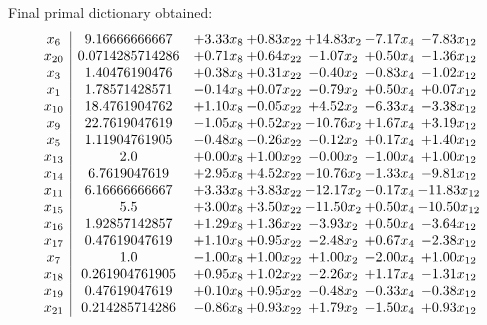 \documentclass[8pt]{article}
\begin{document}
 Final primal dictionary obtained: 
\[\begin{array}{c| c c@{\hskip 2pt} c@{\hskip 2pt} c@{\hskip 2pt} c@{\hskip 2pt} c@{\hskip 2pt} }
 x_{6}   &  9.16666666667 & +  3.33 x_{8} & +  0.83 x_{22} & + 14.83 x_{2} & -7.17 x_{4} & -7.83 x_{12}\\
 x_{20}   &  0.0714285714286 & +  0.71 x_{8} & +  0.64 x_{22} & -1.07 x_{2} & +  0.50 x_{4} & -1.36 x_{12}\\
 x_{3}   &  1.40476190476 & +  0.38 x_{8} & +  0.31 x_{22} & -0.40 x_{2} & -0.83 x_{4} & -1.02 x_{12}\\
 x_{1}   &  1.78571428571 & -0.14 x_{8} & +  0.07 x_{22} & -0.79 x_{2} & +  0.50 x_{4} & +  0.07 x_{12}\\
 x_{10}   &  18.4761904762 & +  1.10 x_{8} & -0.05 x_{22} & +  4.52 x_{2} & -6.33 x_{4} & -3.38 x_{12}\\
 x_{9}   &  22.7619047619 & -1.05 x_{8} & +  0.52 x_{22} & -10.76 x_{2} & +  1.67 x_{4} & +  3.19 x_{12}\\
 x_{5}   &  1.11904761905 & -0.48 x_{8} & -0.26 x_{22} & -0.12 x_{2} & +  0.17 x_{4} & +  1.40 x_{12}\\
 x_{13}   &  2.0 & +  0.00 x_{8} & +  1.00 x_{22} & -0.00 x_{2} & -1.00 x_{4} & +  1.00 x_{12}\\
 x_{14}   &  6.7619047619 & +  2.95 x_{8} & +  4.52 x_{22} & -10.76 x_{2} & -1.33 x_{4} & -9.81 x_{12}\\
 x_{11}   &  6.16666666667 & +  3.33 x_{8} & +  3.83 x_{22} & -12.17 x_{2} & -0.17 x_{4} & -11.83 x_{12}\\
 x_{15}   &  5.5 & +  3.00 x_{8} & +  3.50 x_{22} & -11.50 x_{2} & +  0.50 x_{4} & -10.50 x_{12}\\
 x_{16}   &  1.92857142857 & +  1.29 x_{8} & +  1.36 x_{22} & -3.93 x_{2} & +  0.50 x_{4} & -3.64 x_{12}\\
 x_{17}   &  0.47619047619 & +  1.10 x_{8} & +  0.95 x_{22} & -2.48 x_{2} & +  0.67 x_{4} & -2.38 x_{12}\\
 x_{7}   &  1.0 & -1.00 x_{8} & +  1.00 x_{22} & +  1.00 x_{2} & -2.00 x_{4} & +  1.00 x_{12}\\
 x_{18}   &  0.261904761905 & +  0.95 x_{8} & +  1.02 x_{22} & -2.26 x_{2} & +  1.17 x_{4} & -1.31 x_{12}\\
 x_{19}   &  0.47619047619 & +  0.10 x_{8} & +  0.95 x_{22} & -0.48 x_{2} & -0.33 x_{4} & -0.38 x_{12}\\
 x_{21}   &  0.214285714286 & -0.86 x_{8} & +  0.93 x_{22} & +  1.79 x_{2} & -1.50 x_{4} & +  0.93 x_{12}\\

\end{array}\]
\end{document}
